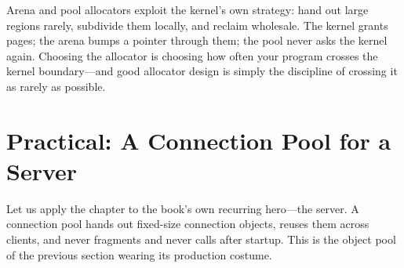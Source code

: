 \begin{osconcept}
Arena and pool allocators exploit the kernel's own strategy: hand out
large regions rarely, subdivide them locally, and reclaim wholesale.
The kernel grants pages; the arena bumps a pointer through them; the
pool never asks the kernel again. Choosing the allocator is choosing
how often your program crosses the kernel boundary---and good
allocator design is simply the discipline of crossing it as rarely as
possible.
\end{osconcept}

\section{Practical: A Connection Pool for a Server}

Let us apply the chapter to the book's own recurring hero---the
server. A connection pool hands out fixed-size connection objects,
reuses them across clients, and never fragments and never calls
 after startup. This is the object pool of the previous
section wearing its production costume.

